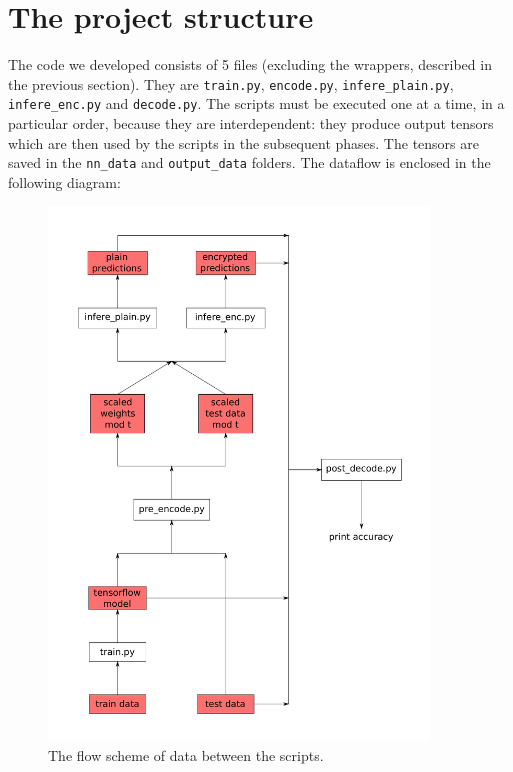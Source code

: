 \section{The project structure}

The code we developed consists of 5 files (excluding the wrappers, described in the previous section). They are \texttt{train.py}, \texttt{encode.py}, \texttt{infere_plain.py}, \texttt{infere_enc.py} and \texttt{decode.py}. The scripts must be executed one at a time, in a particular order, because they are interdependent: they produce output tensors which are then used by the scripts in the subsequent phases. The tensors are saved in the \texttt{nn_data} and \texttt{output_data} folders. The dataflow is enclosed in the following diagram:

\begin{figure}[H]
	\centering
	\includegraphics[width=0.9\textwidth]{images/fig4a.pdf}
    \caption{The flow scheme of data between the scripts.}
    \label{fig:im4}
\end{figure}

